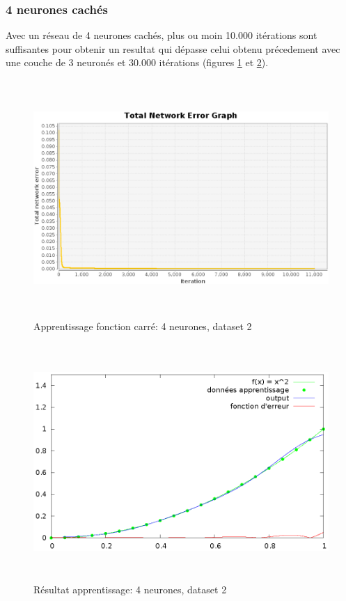 \documentclass[twoside,openright,a4paper,11pt,french]{article}
\begin{document}
\subsubsection{4 neurones cachés}

Avec un réseau de 4 neurones cachés, plus ou moin 10.000 itérations
sont suffisantes pour obtenir un resultat qui dépasse celui obtenu
précedement avec une couche de 3 neuronés et 30.000 itérations 
(figures \ref{fig:sqtest4} et \ref{fig:chartsqtest4}).


\begin{figure}[h]
\centering
\includegraphics[width=12cm,height=9cm]{./pics/sqtest4.eps}
\caption{Apprentissage fonction carré: 4 neurones, dataset 2}
\label{fig:sqtest4}
\end{figure}

\begin{figure}[h]
\centering
\includegraphics[width=12cm,height=9cm]{./pics/chartsqtest4.eps}
\caption{Résultat apprentissage: 4 neurones, dataset 2}
\label{fig:chartsqtest4}
\end{figure}
\end{document}

